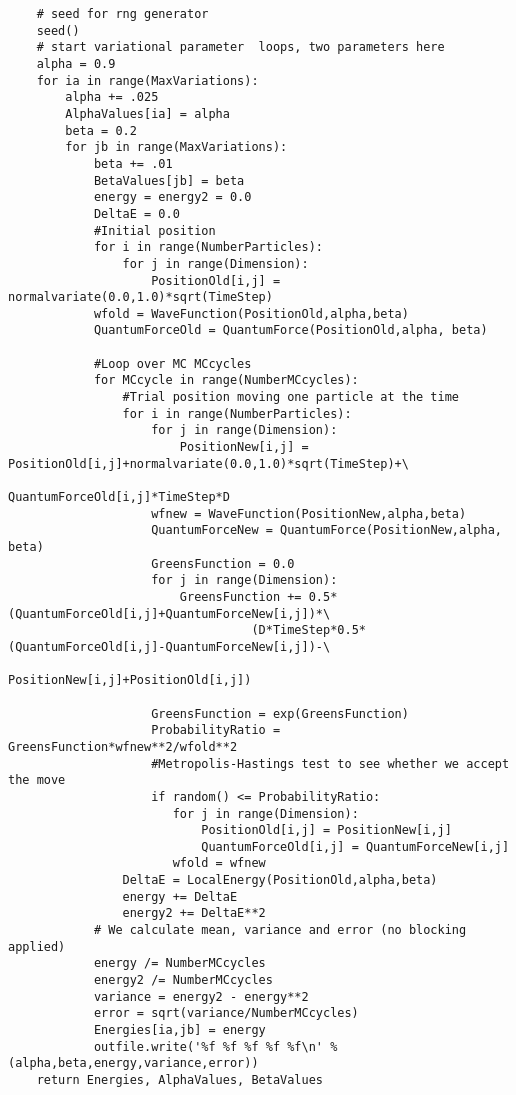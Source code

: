 \documentclass[%
oneside,                 %
final,                   %
10pt]{article}
\begin{document}
\begin{verbatim}
    # seed for rng generator 
    seed()
    # start variational parameter  loops, two parameters here
    alpha = 0.9
    for ia in range(MaxVariations):
        alpha += .025
        AlphaValues[ia] = alpha
        beta = 0.2 
        for jb in range(MaxVariations):
            beta += .01
            BetaValues[jb] = beta
            energy = energy2 = 0.0
            DeltaE = 0.0
            #Initial position
            for i in range(NumberParticles):
                for j in range(Dimension):
                    PositionOld[i,j] = normalvariate(0.0,1.0)*sqrt(TimeStep)
            wfold = WaveFunction(PositionOld,alpha,beta)
            QuantumForceOld = QuantumForce(PositionOld,alpha, beta)

            #Loop over MC MCcycles
            for MCcycle in range(NumberMCcycles):
                #Trial position moving one particle at the time
                for i in range(NumberParticles):
                    for j in range(Dimension):
                        PositionNew[i,j] = PositionOld[i,j]+normalvariate(0.0,1.0)*sqrt(TimeStep)+\
                                           QuantumForceOld[i,j]*TimeStep*D
                    wfnew = WaveFunction(PositionNew,alpha,beta)
                    QuantumForceNew = QuantumForce(PositionNew,alpha, beta)
                    GreensFunction = 0.0
                    for j in range(Dimension):
                        GreensFunction += 0.5*(QuantumForceOld[i,j]+QuantumForceNew[i,j])*\
	                              (D*TimeStep*0.5*(QuantumForceOld[i,j]-QuantumForceNew[i,j])-\
                                      PositionNew[i,j]+PositionOld[i,j])
      
                    GreensFunction = exp(GreensFunction)
                    ProbabilityRatio = GreensFunction*wfnew**2/wfold**2
                    #Metropolis-Hastings test to see whether we accept the move
                    if random() <= ProbabilityRatio:
                       for j in range(Dimension):
                           PositionOld[i,j] = PositionNew[i,j]
                           QuantumForceOld[i,j] = QuantumForceNew[i,j]
                       wfold = wfnew
                DeltaE = LocalEnergy(PositionOld,alpha,beta)
                energy += DeltaE
                energy2 += DeltaE**2
            # We calculate mean, variance and error (no blocking applied)
            energy /= NumberMCcycles
            energy2 /= NumberMCcycles
            variance = energy2 - energy**2
            error = sqrt(variance/NumberMCcycles)
            Energies[ia,jb] = energy    
            outfile.write('%f %f %f %f %f\n' %(alpha,beta,energy,variance,error))
    return Energies, AlphaValues, BetaValues



\end{verbatim}
\end{document}
